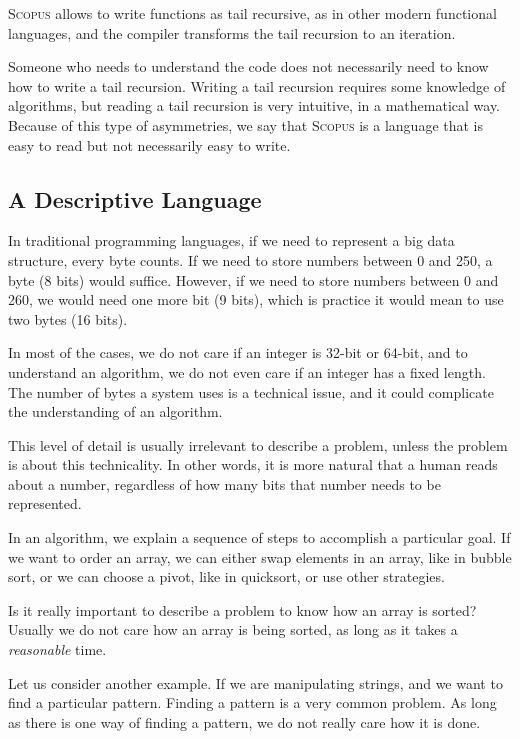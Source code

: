 \documentclass[12pt,a4paper]{article}
\newcommand{\Scopus}{\textsc{Scopus}\xspace}
\begin{document}
    \Scopus allows to write functions as tail recursive, as in other modern functional languages, and the compiler transforms the tail recursion to an iteration.

    Someone who needs to understand the code does not necessarily need to know how to write a tail recursion.
    Writing a tail recursion requires some knowledge of algorithms, but reading a tail recursion is very intuitive, in a mathematical way.
    Because of this type of asymmetries, we say that \Scopus is a language that is easy to read but not necessarily easy to write.

    \subsection{A Descriptive Language}

    In traditional programming languages, if we need to represent a big data structure, every byte counts.
    If we need to store numbers between 0 and 250, a byte (8 bits) would suffice.
    However, if we need to store numbers between 0 and 260, we would need one more bit (9 bits), which is practice it would mean to use two bytes (16 bits).

    In most of the cases, we do not care if an integer is 32-bit or 64-bit, and to understand an algorithm, we do not even care if an integer has a fixed length.
    The number of bytes a system uses is a technical issue, and it could complicate the understanding of an algorithm.

    This level of detail is usually irrelevant to describe a problem, unless the problem is about this technicality.
    In other words, it is more natural that a human reads about a number, regardless of how many bits that number needs to be represented.

    In an algorithm, we explain a sequence of steps to accomplish a particular goal.
    If we want to order an array, we can either swap elements in an array, like in bubble sort, or we can choose a pivot, like in quicksort, or use other strategies.

    Is it really important to describe a problem to know how an array is sorted?
    Usually we do not care how an array is being sorted, as long as it takes a \textit{reasonable} time.

    Let us consider another example.
    If we are manipulating strings, and we want to find a particular pattern.
    Finding a pattern is a very common problem.
    As long as there is one way of finding a pattern, we do not really care how it is done.
\end{document}
